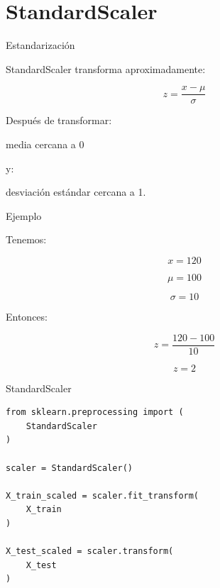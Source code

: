 \documentclass[aspectratio=169,11pt]{beamer}
\begin{document}
\section{StandardScaler}

\begin{frame}{Estandarización}

StandardScaler transforma aproximadamente:

\[
z
=
\frac{
x-\mu
}{
\sigma
}
\]

Después de transformar:

\begin{center}

media cercana a 0
\end{center}

y:

\begin{center}

desviación estándar cercana a 1.
\end{center}

\end{frame}


\begin{frame}{Ejemplo}

Tenemos:

\[
x=120
\]

\[
\mu=100
\]

\[
\sigma=10
\]

Entonces:

\[
z
=
\frac{
120-100
}{
10
}
\]

\[
\boxed{
z=2
}
\]

\end{frame}


\begin{frame}[fragile]{StandardScaler}

\begin{lstlisting}
from sklearn.preprocessing import (
    StandardScaler
)

scaler = StandardScaler()

X_train_scaled = scaler.fit_transform(
    X_train
)

X_test_scaled = scaler.transform(
    X_test
)
\end{lstlisting}

\end{frame}
\end{document}
